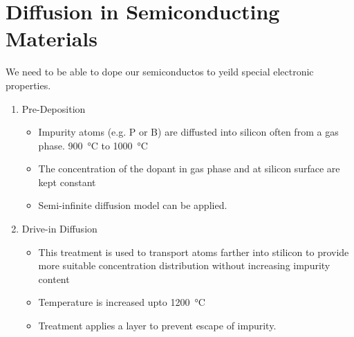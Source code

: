 \documentclass{article}
\begin{document}
\section{Diffusion in Semiconducting Materials}
We need to be able to dope our semiconductos to yeild special electronic properties.

\begin{enumerate}
    \item Pre-Deposition
    \begin{itemize}
        \item Impurity atoms (e.g. P or B) are diffusted into silicon often from a gas phase. \SI{900}{\celsius} to \SI{1000}{\celsius}
        \item The concentration of the dopant in gas phase and at silicon surface are kept constant
        \item Semi-infinite diffusion model can be applied.
    \end{itemize}
    \item Drive-in Diffusion
    \begin{itemize}
        \item This treatment is used to transport atoms farther into stilicon to provide more suitable concentration distribution without increasing impurity content
        \item Temperature is increased upto \SI{1200}{\celsius}
        \item Treatment applies a  layer to prevent escape of impurity.
    \end{itemize}
\end{enumerate}
\end{document}
